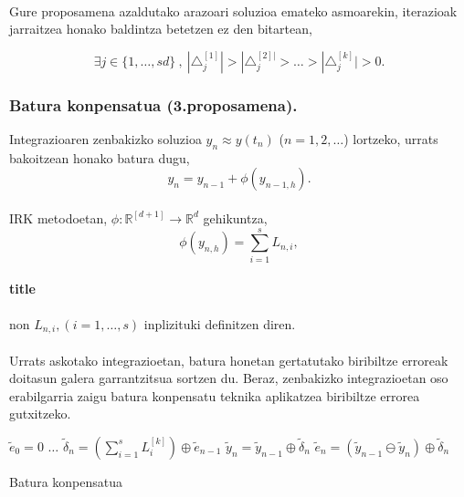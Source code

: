 \paragraph*{} Gure proposamena azaldutako arazoari soluzioa emateko asmoarekin, iterazioak jarraitzea honako baldintza betetzen ez den bitartean,

\begin{equation}
\exists j \in \{1,\dots,sd\} \ , \ |\triangle_j^{[1]}| >|\triangle_j^{[2]|}>\dots>|\triangle_j^{[k]}|>0.
\end{equation}


\subsubsection{Batura konpensatua (3.proposamena).}

Integrazioaren zenbakizko soluzioa  $y_n \approx y(t_n)$ ($n=1,2,\dots$) lortzeko, urrats bakoitzean honako batura dugu,
\begin{equation*}
y_n=y_{n-1} + \phi(y_{n-1,h}).
\end{equation*}   

\paragraph*{} IRK metodoetan, $\phi: \mathbb{R}^{[d+1]} \rightarrow \mathbb{R}^d$ gehikuntza,
\begin{equation*}
\phi(y_{n,h})=\sum\limits_{i=1}^{s} L_{n,i},
\end{equation*}

\paragraph*{title} non $L_{n,i}, (i=1,\dots,s)$ inplizituki definitzen diren.

\paragraph*{} Urrats askotako integrazioetan, batura honetan gertatutako biribiltze erroreak doitasun galera garrantzitsua sortzen du. Beraz, zenbakizko integrazioetan oso erabilgarria zaigu batura konpensatu teknika aplikatzea biribiltze errorea gutxitzeko.

\begin{algorithm}[h]
 \BlankLine
  $\tilde {e}_0=0$\;
  \BlankLine
  {
   $\dots$\;
   \BlankLine
    $\tilde {\delta}_{n}= (\sum\limits_{i=1}^{s} L_{i}^{[k]}) \oplus \tilde {e}_{n-1} $\;
    $\tilde {y}_n=\tilde{y}_{n-1} \oplus \tilde{\delta}_n$\;
    $\tilde {e}_{n}=(\tilde{y}_{n-1} \ominus \tilde{y}_n)\oplus \tilde{\delta}_n$\;            
   \BlankLine
 }
 \caption{Batura konpensatua}
\end{algorithm}

